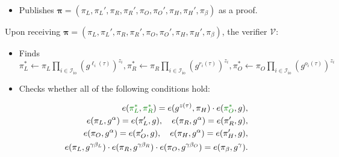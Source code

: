 \documentclass[../lecture-notes-148x210.tex]{subfiles}
\begin{document}
\begin{tcolorbox}
\begin{itemize}[label=]
\begin{align*}
            \pi_L \gets g^{\textcolor{green!50!black}{\ell_{\text{mid}}(\tau)}}, \quad \pi_L' \gets g^{\alpha \textcolor{green!50!black}{\ell_{\text{mid}}(\tau)}}, \\
            \pi_R \gets g^{\textcolor{green!50!black}{r_{\text{mid}}(\tau)}}, \quad \pi_R' \gets g^{\alpha \textcolor{green!50!black}{r_{\text{mid}}(\tau)}}, \\
            \pi_O \gets g^{\textcolor{green!50!black}{o_{\text{mid}}(\tau)}}, \quad \pi_O' \gets g^{\alpha \textcolor{green!50!black}{o_{\text{mid}}(\tau)}}, \\
            \pi_H \gets g^{h(\tau)}, \quad \pi_H' \gets g^{\alpha h(\tau)}, \\
            \pi_{\beta} \gets g^{\beta_L\ell(\tau) + \beta_Rr(\tau) + \beta_Oo(\tau)}.
        \end{align*}
        \item Publishes $\boldsymbol{\pi} = (\pi_L,\pi_L',\pi_R,\pi_R',\pi_O,\pi_O',\pi_H,\pi_H',\pi_{\beta})$ as a proof.
    \end{itemize}

    \newpage
    Upon receiving $\boldsymbol{\pi} = (\pi_L,\pi_L',\pi_R,\pi_R',\pi_O,\pi_O',\pi_H,\pi_H',\pi_{\beta})$, the verifier $\mathcal{V}$:
    \begin{itemize}[label=]
        \item \textcolor{green!50!black}{Finds $\pi_L^* \gets \pi_L\prod_{i \in \mathcal{I}_{\text{io}}} (g^{\ell_i(\tau)})^{z_i},\pi_R^* \gets \pi_R\prod_{i \in \mathcal{I}_{\text{io}}} (g^{r_i(\tau)})^{z_i},\pi_O^* \gets \pi_O\prod_{i \in \mathcal{I}_{\text{io}}} (g^{o_i(\tau)})^{z_i}$}
        \item Checks whether all of the following conditions hold:
    \end{itemize}
    \begin{align*}
        e(\textcolor{green!50!black}{\pi_L^*}, \textcolor{green!50!black}{\pi_R^*}) = e(g^{z(\tau)}, \pi_H) \cdot e(\textcolor{green!50!black}{\pi_O^*}, g), \\
        e(\pi_L, g^{\alpha}) = e(\pi_L', g), \quad e(\pi_R, g^{\alpha}) = e(\pi_R', g), \\
        e(\pi_O, g^{\alpha}) = e(\pi_O', g), \quad e(\pi_H, g^{\alpha}) = e(\pi_H', g), \\
        e(\pi_L, g^{\gamma\beta_L}) \cdot e(\pi_R, g^{\gamma\beta_R}) \cdot e(\pi_O, g^{\gamma\beta_O}) = e(\pi_{\beta}, g^{\gamma}).
    \end{align*}
\end{tcolorbox}
\end{document}
